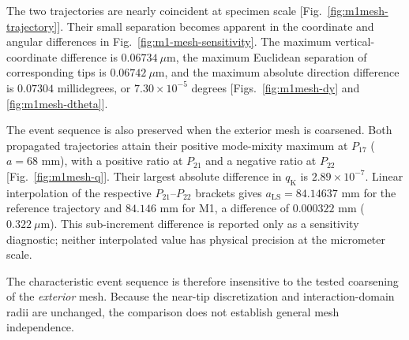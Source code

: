 \documentclass[11pt]{article}
\begin{document}
The two trajectories are nearly coincident at specimen scale
[Fig.~\ref{fig:m1mesh-trajectory}]. Their small separation becomes
apparent in the coordinate and angular differences in
Fig.~\ref{fig:m1-mesh-sensitivity}. The maximum vertical-coordinate
difference is $0.06734~\mu\mathrm{m}$, the maximum Euclidean separation of
corresponding tips is $0.06742~\mu\mathrm{m}$, and the maximum absolute direction
difference is $0.07304$ millidegrees, or $7.30\times10^{-5}$ degrees
[Figs.~\ref{fig:m1mesh-dy} and \ref{fig:m1mesh-dtheta}].

The event sequence is also preserved when the exterior
mesh is coarsened. Both propagated trajectories attain
their positive mode-mixity maximum at $P_{17}$
($a=68$ mm), with a positive ratio at $P_{21}$ and
a negative ratio at $P_{22}$ [Fig.~\ref{fig:m1mesh-q}].
Their largest absolute difference in $q_{\mathrm{K}}$
is $2.89\times10^{-7}$. Linear interpolation of
the respective $P_{21}$--$P_{22}$ brackets gives
$a_{\mathrm{LS}}=84.14637$ mm for the reference trajectory and
$84.146$ mm for M1, a difference of $0.000322$ mm
($0.322~\mu\mathrm{m}$). This sub-increment difference is reported only as a
sensitivity diagnostic; neither interpolated value has physical precision
at the micrometer scale.

The characteristic event sequence is therefore insensitive
to the tested coarsening of the \emph{exterior} mesh.
Because the near-tip discretization and interaction-domain
radii are unchanged, the comparison does not establish
general mesh independence.
\end{document}
